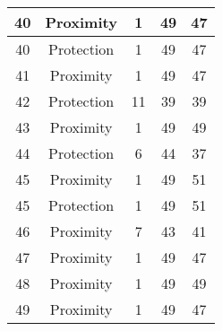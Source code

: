 \documentclass[results.tex]{subfiles}
\begin{document}
\begin{center}
\begin{tabular}{| c || c | c | c | c |}
            \hline
            40                      & Proximity                    & 1                      & 49                      & 47                   \\
            \hline
            40                      & Protection                   & 1                      & 49                      & 47                   \\
            \hline
            41                      & Proximity                    & 1                      & 49                      & 47                   \\
            \hline
            42                      & Protection                   & 11                     & 39                      & 39                   \\
            \hline
            43                      & Proximity                    & 1                      & 49                      & 49                   \\
            \hline
            44                      & Protection                   & 6                      & 44                      & 37                   \\
            \hline
            45                      & Proximity                    & 1                      & 49                      & 51                   \\
            \hline
            45                      & Protection                   & 1                      & 49                      & 51                   \\
            \hline
            46                      & Proximity                    & 7                      & 43                      & 41                   \\
            \hline
            47                      & Proximity                    & 1                      & 49                      & 47                   \\
            \hline
            48                      & Proximity                    & 1                      & 49                      & 49                   \\
            \hline
            49                      & Proximity                    & 1                      & 49                      & 47                   \\
            \hline
        \end{tabular}
    \end{center}
\end{document}
